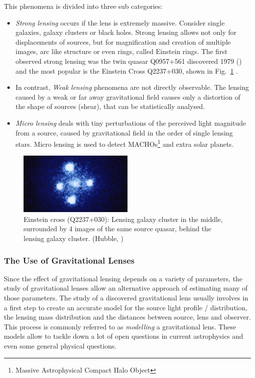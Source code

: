 \documentclass[11pt]{article}
\begin{document}
This phenomena is divided into three sub categories:
\begin{itemize}
	\item \emph{Strong lensing} occurs if the lens is extremely massive. Consider single galaxies, galaxy clusters or black holes.
Strong lensing allows not only for displacements of sources, but for magnification and creation of multiple images, arc like structure or even rings, called Einstein rings.
The first observed strong lensing was the twin quasar Q0957+561 discovered 1979 (\cite{walsh19790957}) and the most popular is the Einstein Cross Q2237+030, shown in Fig.~\ref{fig:einsteinc} \cite{ec1985}.
  \item In contrast, \emph{Weak lensing} phenomena are not directly observable.
The lensing caused by a weak or far away gravitational field causes only a distortion of the shape of sources (shear), that can be statistically analysed.
  \item \emph{Micro lensing} deals with tiny perturbations of the perceived light magnitude from a source, caused by gravitational field in the order of single lensing stars.
Micro lensing is used to detect MACHOs\footnote{Massive Astrophysical Compact Halo Object} and extra solar planets.
\end{itemize}

\begin{figure}[h]
	\centering
		\includegraphics[width=0.5\textwidth]{img/einstein_cross}
	\caption{Einstein cross (Q2237+030): Lensing galaxy cluster in the middle, surrounded by 4 images of the same source quasar, behind the lensing galaxy cluster. (Hubble, \cite{ec1985})}
	\label{fig:einsteinc}
\end{figure}



\subsubsection{The Use of Gravitational Lenses}

Since the effect of gravitational lensing depends on a variety of parameters, the study of gravitational lenses allow an alternative approach of estimating many of those parameters.
The study of a discovered gravitational lens usually involves in a first step to create an accurate model for the source light profile / distribution, the lensing mass distribution and the distances between source, lens and observer.
This process is commonly referred to as \emph{modelling} a gravitational lens.
These models allow to tackle down a lot of open questions in current astrophysics and even some general physical questions.
\end{document}
